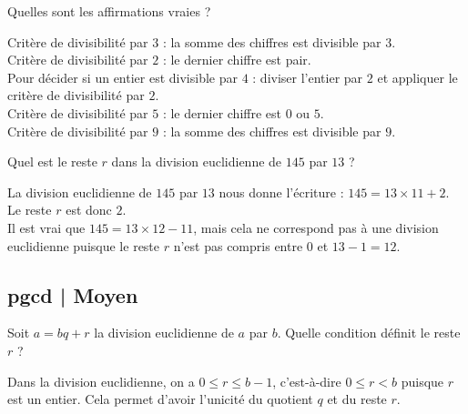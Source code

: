 \begin{question}
    Quelles sont les affirmations vraies ?
    \begin{answers} 
    \end{answers}
    \begin{explanations} 
     Critère de divisibilité par $3$ : la somme des chiffres est divisible par $3$. \\
     Critère de divisibilité par $2$ : le dernier chiffre est pair. \\    
     Pour décider si un entier est divisible par $4$ : diviser l'entier par $2$ et appliquer le critère de divisibilité par $2$. \\  
      Critère de divisibilité par $5$ : le dernier chiffre est $0$ ou $5$. \\ 
     Critère de divisibilité par $9$ : la somme des chiffres est divisible par $9$. \\                  
    \end{explanations}
\end{question}

\begin{question}
    Quel est le reste $r$ dans la division euclidienne de $145$ par $13$ ?
    \begin{answers} 
    \end{answers}
    \begin{explanations} 
     La division euclidienne de $145$ par $13$ nous donne l'écriture : $145 = 13 \times 11 + 2$. Le reste $r$ est donc $2$.\\
     Il est vrai que $145 = 13 \times 12 - 11$, mais cela ne correspond pas à une division euclidienne puisque le reste $r$ n'est pas compris entre $0$ et $13-1=12$.
    \end{explanations}
\end{question}

\subsection{pgcd | Moyen}


\begin{question}
    Soit $a=bq+r$ la division euclidienne de $a$ par $b$.
    Quelle condition définit le reste $r$ ?
    \begin{answers} 
    \end{answers}
    \begin{explanations}
    Dans la division euclidienne, on a $0 \le r \le b-1$, c’est-à-dire $0 \le r < b$ puisque $r$ est un entier. 
    Cela permet d'avoir l'unicité du quotient $q$ et du reste $r$.
    \end{explanations}
\end{question}


